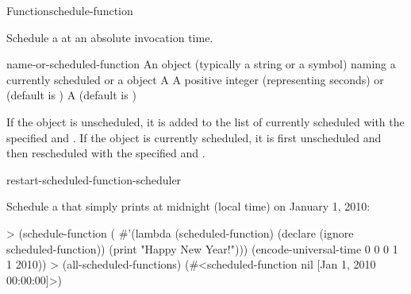 \begin{functiondoc}{Function}{schedule-function}%
  { 
     }
%
%
%

\fnsyntax

\fnpurpose Schedule a  at an absolute invocation time.

\fnpackage {}

\fnmodule {}

\fnargs
\begin{args}{name-or-scheduled-function}
 An object (typically a string or a
  symbol) naming a currently scheduled  or a
   object
 A 
 A positive integer (representing seconds) or
  \nil{} (default is \nil)
\arg[verbose] A  
  (default is \textbf{})
\end{args}

\fnerrors
\nothreads{}

\fndescription If the  object is unscheduled, it is
added to the list of currently scheduled  with the
specified  and .  If the
 object is currently scheduled, it is first
unscheduled and then rescheduled with the specified 
and .

\begin{alsos}{restart-scheduled-function-scheduler}
\end{alsos}

%
\fnexamples
Schedule a  that simply prints  
at midnight (local time) on January 1, 2010:
\begin{example}
> (schedule-function
    (
      #'(lambda (scheduled-function)
          (declare (ignore scheduled-function))
          (print "Happy New Year!")))
     (encode-universal-time 0 0 0 1 1 2010))
> (all-scheduled-functions)
(#<scheduled-function nil [Jan 1, 2010 00:00:00]>)
\end{example}


\end{functiondoc}
